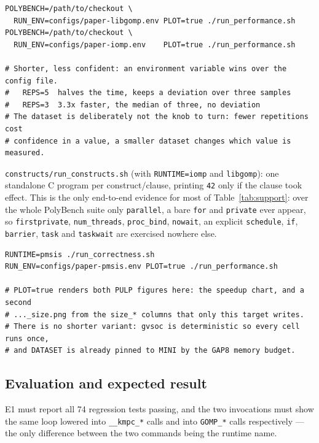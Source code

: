
{\small
\begin{verbatim}
POLYBENCH=/path/to/checkout \
  RUN_ENV=configs/paper-libgomp.env PLOT=true ./run_performance.sh
POLYBENCH=/path/to/checkout \
  RUN_ENV=configs/paper-iomp.env    PLOT=true ./run_performance.sh

# Shorter, less confident: an environment variable wins over the config file.
#   REPS=5  halves the time, keeps a deviation over three samples
#   REPS=3  3.3x faster, the median of three, no deviation
# The dataset is deliberately not the knob to turn: fewer repetitions cost
# confidence in a value, a smaller dataset changes which value is measured.
\end{verbatim}
}

\texttt{constructs/run\_constructs.sh} (with \texttt{RUNTIME=iomp} and
\texttt{libgomp}): one standalone C program per construct/clause, printing
\texttt{42} only if the clause took effect.  This is the only end-to-end
evidence for most of Table~\ref{tab:support}: over the whole PolyBench suite
only \texttt{parallel}, a bare \texttt{for} and \texttt{private} ever appear,
so \texttt{firstprivate}, \texttt{num\_threads}, \texttt{proc\_bind},
\texttt{nowait}, an explicit \texttt{schedule}, \texttt{if}, \texttt{barrier},
\texttt{task} and \texttt{taskwait} are exercised nowhere else.


{\small
\begin{verbatim}
RUNTIME=pmsis ./run_correctness.sh
RUN_ENV=configs/paper-pmsis.env PLOT=true ./run_performance.sh

# PLOT=true renders both PULP figures here: the speedup chart, and a second
# ..._size.png from the size_* columns that only this target writes.
# There is no shorter variant: gvsoc is deterministic so every cell runs once,
# and DATASET is already pinned to MINI by the GAP8 memory budget.
\end{verbatim}
}

\subsection{Evaluation and expected result}

E1 must report all 74 regression tests passing, and the two invocations must
show the same loop lowered into \texttt{\_\_kmpc\_*} calls and into
\texttt{GOMP\_*} calls respectively --- the only difference between the two
commands being the runtime name.

